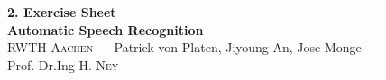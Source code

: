 \documentclass[12pt,oneside,a4paper]{article}
\begin{document}
\begin{center}
{\LARGE \bfseries 
 2. Exercise Sheet  \\[0.1cm] 
}
{ \large \bfseries
 Automatic Speech Recognition \\[0.3cm] %
}
{\large
  \textsc{RWTH Aachen} --- Patrick von Platen, Jiyoung An, Jose Monge ---\\[0.3cm]
}
{\normalsize
  Prof. Dr.Ing H. \textsc{Ney} \\[0.92cm] %
}
\end{center}
  
 \newpage
 \newpage
 \newpage


\end{document}
